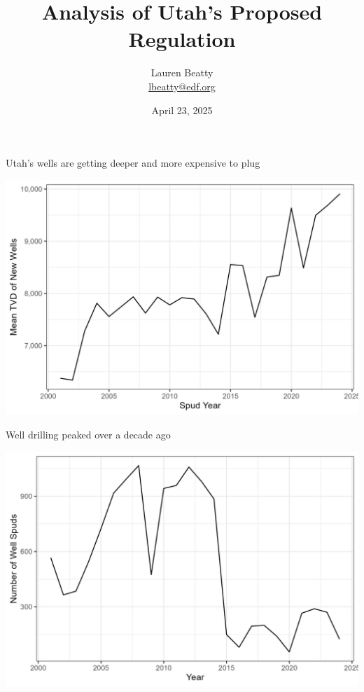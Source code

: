 \documentclass{beamer}
\title{Analysis of Utah's Proposed Regulation}
\author{Lauren Beatty\\ \href{mailto:lbeatty@edf.org}{lbeatty@edf.org}}
\institute{Environmental Defense Fund}
\date{April 23, 2025}
\begin{document}
\frame{\titlepage}

\begin{frame}{Utah's wells are getting deeper and more expensive to plug}

\includegraphics[width=\textwidth]{Figures/NewWellsDepth.jpg}
    
\end{frame}


\begin{frame}{Well drilling peaked over a decade ago}

\includegraphics[width=\textwidth]{Figures/NewWellsTimeseries.jpg}
    
\end{frame}
\end{document}
